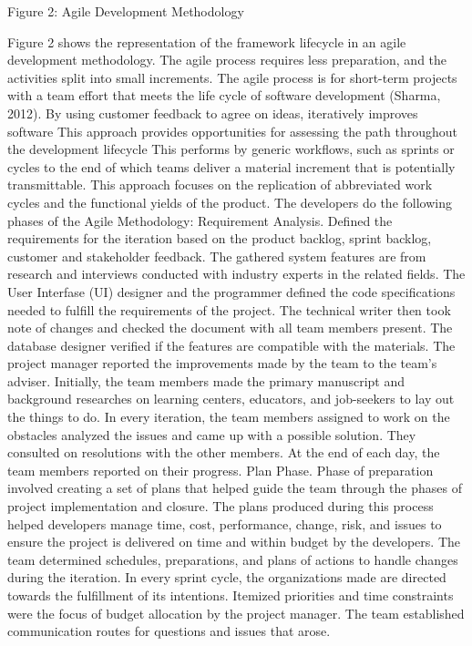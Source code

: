Figure 2: Agile Development Methodology
 
Figure 2 shows the representation of the framework lifecycle in an agile development methodology. The agile process requires less preparation, and the activities split into small increments. The agile process is for short-term projects with a team effort that meets the life cycle of software development (Sharma, 2012). By using customer feedback to agree on ideas, iteratively improves software This approach provides opportunities for assessing the path throughout the development lifecycle This performs by generic workflows, such as sprints or cycles to the end of which teams deliver a material increment that is potentially transmittable. This approach focuses on the replication of abbreviated work cycles and the functional yields of the product.
The developers do the following phases of the Agile Methodology:
Requirement Analysis. Defined the requirements for the iteration based on the product backlog, sprint backlog, customer and stakeholder feedback.
	The gathered system features are from research and interviews conducted with industry experts in the related fields. The User Interfase (UI) designer and the programmer defined the code specifications needed to fulfill the requirements of the project. The technical writer then took note of changes and checked the document with all team members present. The database designer verified if the features are compatible with the materials. The project manager reported the improvements made by the team to the team's adviser.
Initially, the team members made the primary manuscript and background researches on learning centers, educators, and job-seekers to lay out the things to do. In every iteration, the team members assigned to work on the obstacles analyzed the issues and came up with a possible solution. They consulted on resolutions with the other members. At the end of each day, the team members reported on their progress.
Plan Phase. Phase of preparation involved creating a set of plans that helped guide the team through the phases of project implementation and closure. The plans produced during this process helped developers manage time, cost, performance, change, risk, and issues to ensure the project is delivered on time and within budget by the developers. 
The team determined schedules, preparations, and plans of actions to handle changes during the iteration. In every sprint cycle, the organizations made are directed towards the fulfillment of its intentions. Itemized priorities and time constraints were the focus of budget allocation by the project manager. The team established communication routes for questions and issues that arose.
